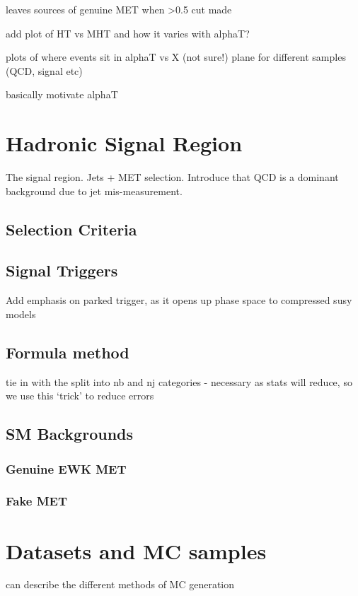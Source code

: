 leaves sources of genuine MET when >0.5 cut made

add plot of HT vs MHT and how it varies with alphaT?

plots of where events sit in alphaT vs X (not sure!) plane for different samples (QCD, signal etc)

basically motivate alphaT

\section{Hadronic Signal Region}
\label{sec:selection_hadronic}
The signal region. Jets + MET selection.
Introduce that QCD is a dominant background due to jet mis-measurement.

\subsection{Selection Criteria}

\subsection{Signal Triggers}

Add emphasis on parked trigger, as it opens up phase space to compressed susy models

\subsection{Formula method}

tie in with the split into nb and nj categories - necessary as stats will reduce, so we use
this `trick' to reduce errors

\subsection{SM Backgrounds}
\subsubsection{Genuine EWK MET}
\subsubsection{Fake MET}



\section{Datasets and MC samples}

can describe the different methods of MC generation